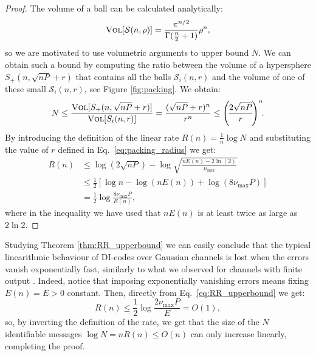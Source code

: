 \documentclass[10pt,conference]{IEEEtran}
\newcommand{\1}{\mathds{1}}
\newcommand{\cS}{\mathcal{S}}
\begin{document}
\begin{proof}
The volume of a ball can be calculated analytically:
\begin{equation}
  \label{eq:volume_hypersphere}
  \textsc{Vol}[\cS(n,\rho)]
    = \frac{\pi^{n/2}}{\Gamma(\frac{n}{2}+1)}\rho^n,
\end{equation}
so we are motivated to use volumetric arguments to upper bound $N$. We can obtain such a bound by computing the ratio between the volume of a hypersphere $S_+(n,\sqrt{nP}+r)$ that contains all the balls $\cS_i(n,r)$ and the volume of one of these small $\cS_i(n,r)$, see Figure \ref{fig:packing}. We obtain:
\begin{equation*}
  \label{eq:N_upperbound}
  N \leq \frac{\textsc{Vol}[S_+(n,\sqrt{nP}+r)]}{\textsc{Vol}[S_i(n,r)]}
    = \frac{(\sqrt{nP}+r)^n}{r^n}\leq\left(\!\frac{2\sqrt{nP}}{r}\!\right)^n\!\!.
\end{equation*}
By introducing the definition of the linear rate $R(n)=\frac1n \log N$ and substituting the value of $r$ defined in Eq.~\eqref{eq:packing_radius} we get:
\begin{equation}
\label{eq:RR_upperbound}
\begin{split}
  R(n)
   &\leq\log\left(2\sqrt{nP}\right) - \log\sqrt{\frac{nE(n)-2\ln(2)}{\nu_{\max}}}\\
   &\leq\frac12\left[\log n -\log\left(nE(n)\right)+\log\left(8\nu_{\max}P\right)\right]\\
   &= \frac12\log\frac{8\nu_{\max}P}{E(n)},
\end{split}
\end{equation}
where in the inequality we have used that $nE(n)$ is at least twice as large as $2\ln 2$.
\end{proof}

Studying Theorem \ref{thm:RR_upperbound} 
we can easily conclude that the typical linearithmic behaviour of DI-codes over Gaussian channels is lost when the errors vanish exponentially fast, similarly to what we observed for channels with finite output \cite{CDBW:Reliability-TCOM}. Indeed, notice that imposing exponentially vanishing errors means fixing $E(n)=E>0$ constant. Then, directly from Eq.~\eqref{eq:RR_upperbound} we get:
\begin{equation}
  \label{eq:lost_linearithmicality}
  R(n) \leq \frac12\log\frac{2\nu_{\max}P}{E} = O(1),
\end{equation}
so, by inverting the definition of the rate, we get that the size of the $N$ identifiable messages $\log N=nR(n)\le O(n)$ can only increase linearly, completing the proof.
\end{document}
